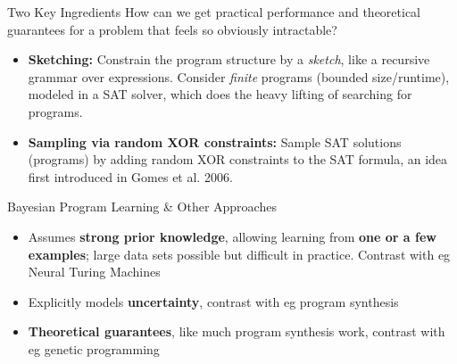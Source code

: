 \documentclass[final]{beamer}
\newlength{\onecolwid}
\begin{document}
\begin{frame}[t]
\begin{columns}[t]
\begin{column}{\onecolwid}
\begin{block}{Two Key Ingredients}
How can we get practical  performance and theoretical guarantees for a problem that feels so obviously intractable?
  \begin{itemize}
  \item \textbf{Sketching:} Constrain the program structure by a \emph{sketch},
    like a recursive grammar over
    expressions. Consider \emph{finite} programs (bounded size/runtime), modeled in a SAT solver, which does the heavy lifting of searching for programs.
  \item \textbf{Sampling via random XOR constraints:} Sample SAT solutions (programs) by adding random XOR constraints to the SAT formula,
    an idea first introduced in Gomes et al. 2006.
  \end{itemize}
\end{block}


\begin{block}{Bayesian Program Learning \& Other Approaches}
  \begin{itemize}
  \item Assumes \textbf{strong prior knowledge}, allowing learning from \textbf{one or a few examples}; large data sets possible but difficult in practice. Contrast with eg Neural Turing Machines
  \item Explicitly models \textbf{uncertainty}, contrast with eg program synthesis
  \item \textbf{Theoretical guarantees}, like much program synthesis work, contrast with eg genetic programming
  \end{itemize}
\end{block}



\end{column}
\end{columns}
\end{frame}
\end{document}
